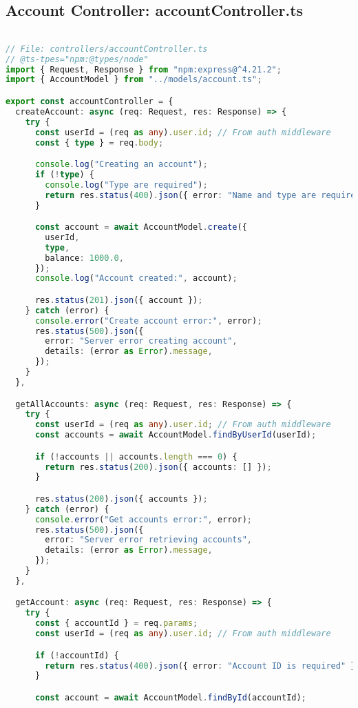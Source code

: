 \subsection{Account Controller: accountController.ts}
\begin{lstlisting}[language=TypeScript]

// File: controllers/accountController.ts
// @ts-tpes="npm:@types/node"
import { Request, Response } from "npm:express@^4.21.2";
import { AccountModel } from "../models/account.ts";

export const accountController = {
  createAccount: async (req: Request, res: Response) => {
    try {
      const userId = (req as any).user.id; // From auth middleware
      const { type } = req.body;

      console.log("Creating an account");
      if (!type) {
        console.log("Type are required");
        return res.status(400).json({ error: "Name and type are required" });
      }

      const account = await AccountModel.create({
        userId,
        type,
        balance: 1000.0,
      });
      console.log("Account created:", account);

      res.status(201).json({ account });
    } catch (error) {
      console.error("Create account error:", error);
      res.status(500).json({
        error: "Server error creating account",
        details: (error as Error).message,
      });
    }
  },

  getAllAccounts: async (req: Request, res: Response) => {
    try {
      const userId = (req as any).user.id; // From auth middleware
      const accounts = await AccountModel.findByUserId(userId);

      if (!accounts || accounts.length === 0) {
        return res.status(200).json({ accounts: [] });
      }

      res.status(200).json({ accounts });
    } catch (error) {
      console.error("Get accounts error:", error);
      res.status(500).json({
        error: "Server error retrieving accounts",
        details: (error as Error).message,
      });
    }
  },

  getAccount: async (req: Request, res: Response) => {
    try {
      const { accountId } = req.params;
      const userId = (req as any).user.id; // From auth middleware

      if (!accountId) {
        return res.status(400).json({ error: "Account ID is required" });
      }

      const account = await AccountModel.findById(accountId);


\end{lstlisting}
